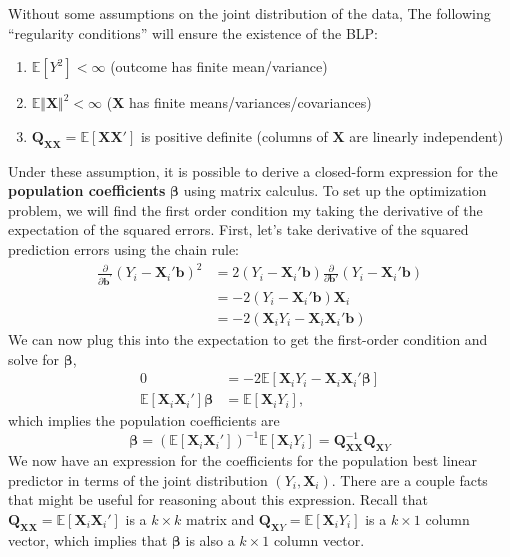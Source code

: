 \documentclass[
  letterpaper,
  DIV=11,
  numbers=noendperiod]{scrreprt}
\providecommand{\tightlist}{%
  \setlength{\itemsep}{0pt}\setlength{\parskip}{0pt}}\usepackage{longtable,booktabs,array}
\newcommand{\mb}{\symbf}
\newcommand{\E}{\mathbb{E}}
\newcommand{\X}{\mb{X}}
\newcommand{\bfbeta}{\mb{\beta}}
\theoremstyle{definition}
\theoremstyle{plain}
\theoremstyle{definition}
\theoremstyle{remark}
\begin{document}
\begin{tcolorbox}[enhanced jigsaw, title=\textcolor{quarto-callout-note-color}{\faInfo}\hspace{0.5em}{Best linear projection assumptions}, breakable, titlerule=0mm, opacityback=0, rightrule=.15mm, bottomrule=.15mm, colframe=quarto-callout-note-color-frame, coltitle=black, colbacktitle=quarto-callout-note-color!10!white, bottomtitle=1mm, toptitle=1mm, colback=white, arc=.35mm, opacitybacktitle=0.6, toprule=.15mm, leftrule=.75mm, left=2mm]

Without some assumptions on the joint distribution of the data, The
following ``regularity conditions'' will ensure the existence of the
BLP:

\begin{enumerate}
\def\labelenumi{\arabic{enumi}.}
\tightlist
\item
  \(\E[Y^2] < \infty\) (outcome has finite mean/variance)
\item
  \(\E\Vert \mb{X} \Vert^2 < \infty\) (\(\mb{X}\) has finite
  means/variances/covariances)
\item
  \(\mb{Q}_{\mb{XX}} = \E[\mb{XX}']\) is positive definite (columns of
  \(\X\) are linearly independent)\\
\end{enumerate}

\end{tcolorbox}

Under these assumption, it is possible to derive a closed-form
expression for the \textbf{population coefficients} \(\bfbeta\) using
matrix calculus. To set up the optimization problem, we will find the
first order condition my taking the derivative of the expectation of the
squared errors. First, let's take derivative of the squared prediction
errors using the chain rule: \[ 
\begin{aligned}
  \frac{\partial}{\partial \mb{b}^{'}}\left(Y_{i} - \X_{i}'\mb{b}\right)^{2}
  &= 2\left(Y_{i} - \X_{i}'\mb{b}\right)\frac{\partial}{\partial \mb{b}'}(Y_{i} - \X_{i}'\mb{b})  \\
  &= -2\left(Y_{i} - \X_{i}'\mb{b}\right)\X_{i} \\
  &= -2\left(\X_{i}Y_{i} - \X_{i}\X_{i}'\mb{b}\right)
\end{aligned}
\] We can now plug this into the expectation to get the first-order
condition and solve for \(\bfbeta\), \[ 
\begin{aligned}
  0 &= -2\E[\X_{i}Y_{i} - \X_{i}\X_{i}'\bfbeta ]  \\
  \E[\X_{i}\X_{i}'] \bfbeta &= \E[\X_{i}Y_{i}],
\end{aligned}
\] which implies the population coefficients are \[ 
\bfbeta = \left(\E[\X_{i}\X_{i}']\right)^{-1}\E[\X_{i}Y_{i}] = \mb{Q}_{\mb{XX}}^{-1}\mb{Q}_{\mb{X}Y}
\] We now have an expression for the coefficients for the population
best linear predictor in terms of the joint distribution
\((Y_{i}, \X_{i})\). There are a couple facts that might be useful for
reasoning about this expression. Recall that
\(\mb{Q}_{\mb{XX}} = \E[\X_{i}\X_{i}']\) is a \(k\times k\) matrix and
\(\mb{Q}_{\X Y} = \E[\X_{i}Y_{i}]\) is a \(k\times 1\) column vector,
which implies that \(\bfbeta\) is also a \(k \times 1\) column vector.
\end{document}
